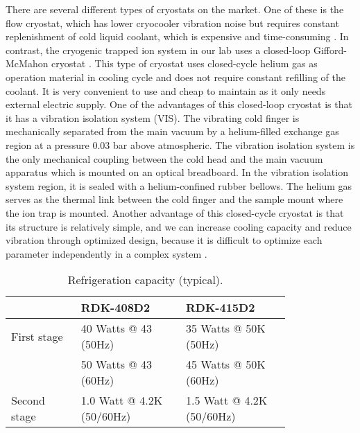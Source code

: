 There are several different types of cryostats on the market. One of these is the flow cryostat, which has lower cryocooler vibration noise but requires constant replenishment of cold liquid coolant, which is expensive and time-consuming \cite{RN283}. In contrast, the cryogenic trapped ion system in our lab uses a closed-loop Gifford-McMahon cryostat \cite{RN284,RN285,RN39,RN282,RN206}. This type of cryostat uses closed-cycle helium gas as operation material in cooling cycle and does not require constant refilling of the coolant. It is very convenient to use and cheap to maintain as it only needs external electric supply.
One of the advantages of this closed-loop cryostat is that it has a vibration isolation system (VIS). The vibrating cold finger is mechanically separated from the main vacuum by a helium-filled exchange gas region at a pressure 0.03 bar above atmospheric. The vibration isolation system is the only mechanical coupling between the cold head and the main vacuum apparatus which is mounted on an optical breadboard. In the vibration isolation system region, it is sealed with a helium-confined rubber bellows. The helium gas serves as the thermal link between the cold finger and the sample mount where the ion trap is mounted. Another advantage of this closed-cycle cryostat is that its structure is relatively simple, and we can increase cooling capacity and reduce vibration through optimized design, because it is difficult to optimize each parameter independently in a complex system \cite{RN120}.

\begin{table}
    \centering
    \caption{Refrigeration capacity (typical).}
    \begin{tabular}{p{0.2\linewidth}p{0.3\linewidth}p{0.3\linewidth}}
        \toprule
                     & RDK-408D2                 & RDK-415D2                 \\
        \midrule
        First stage  & 40 Watts @ 43 (50Hz)      & 35 Watts @ 50K (50Hz)     \\
                     & 50 Watts @ 43 (60Hz)      & 45 Watts @ 50K (60Hz)     \\
        Second stage & 1.0 Watt @ 4.2K (50/60Hz) & 1.5 Watt @ 4.2K (50/60Hz) \\
        \bottomrule
    \end{tabular}
    \label{tab:refrigeration_capacity}
\end{table}

